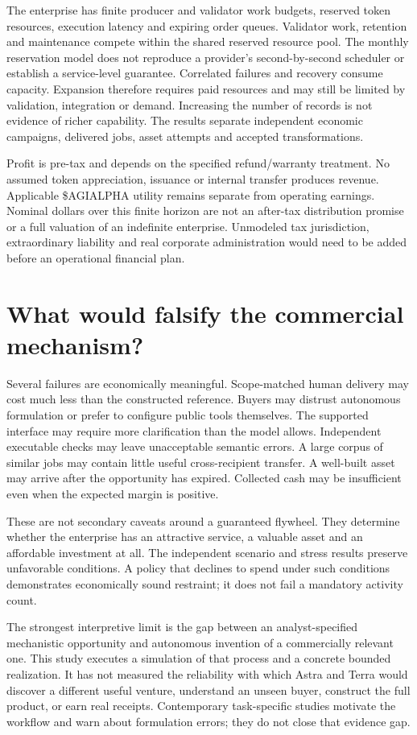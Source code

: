 \documentclass[11pt,letterpaper]{article}
\begin{document}
The enterprise has finite producer and validator work budgets, reserved token resources, execution latency and expiring order queues. Validator work, retention and maintenance compete within the shared reserved resource pool. The monthly reservation model does not reproduce a provider's second-by-second scheduler or establish a service-level guarantee. Correlated failures and recovery consume capacity. Expansion therefore requires paid resources and may still be limited by validation, integration or demand. Increasing the number of records is not evidence of richer capability. The results separate independent economic campaigns, delivered jobs, asset attempts and accepted transformations.

Profit is pre-tax and depends on the specified refund/warranty treatment. No assumed token appreciation, issuance or internal transfer produces revenue. Applicable \$AGIALPHA utility remains separate from operating earnings. Nominal dollars over this finite horizon are not an after-tax distribution promise or a full valuation of an indefinite enterprise. Unmodeled tax jurisdiction, extraordinary liability and real corporate administration would need to be added before an operational financial plan.

\section{What would falsify the commercial mechanism?}
Several failures are economically meaningful. Scope-matched human delivery may cost much less than the constructed reference. Buyers may distrust autonomous formulation or prefer to configure public tools themselves. The supported interface may require more clarification than the model allows. Independent executable checks may leave unacceptable semantic errors. A large corpus of similar jobs may contain little useful cross-recipient transfer. A well-built asset may arrive after the opportunity has expired. Collected cash may be insufficient even when the expected margin is positive.

These are not secondary caveats around a guaranteed flywheel. They determine whether the enterprise has an attractive service, a valuable asset and an affordable investment at all. The independent scenario and stress results preserve unfavorable conditions. A policy that declines to spend under such conditions demonstrates economically sound restraint; it does not fail a mandatory activity count.

The strongest interpretive limit is the gap between an analyst-specified mechanistic opportunity and autonomous invention of a commercially relevant one. This study executes a simulation of that process and a concrete bounded realization. It has not measured the reliability with which Astra and Terra would discover a different useful venture, understand an unseen buyer, construct the full product, or earn real receipts. Contemporary task-specific studies motivate the workflow and warn about formulation errors; they do not close that evidence gap.
\end{document}
